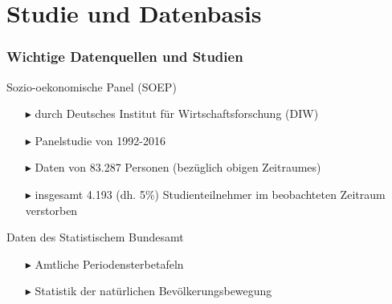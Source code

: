 \documentclass{beamer}
\begin{document}
\section{Studie und Datenbasis}
\begin{frame}
\frametitle{Wichtige Datenquellen und Studien}
  \begin{block}{Sozio-oekonomische Panel (SOEP)}
   \begin{itemize}
     \item [$\blacktriangleright$] durch Deutsches Institut für   Wirtschaftsforschung (DIW)
     \item [$\blacktriangleright$] Panelstudie von 1992-2016
     \item [$\blacktriangleright$] Daten von  83.287 Personen (bezüglich obigen Zeitraumes)
     \item[$\blacktriangleright$] insgesamt 4.193 (dh. 5\%) Studienteilnehmer im beobachteten Zeitraum verstorben
   \end{itemize}
  \end{block}
  \begin{block}{Daten des Statistischem Bundesamt}
   \begin{itemize}
     \item [$\blacktriangleright$] Amtliche Periodensterbetafeln
     \item [$\blacktriangleright$] Statistik der natürlichen Bevölkerungsbewegung
   \end{itemize}
  \end{block}
\end{frame}

\end{document}
